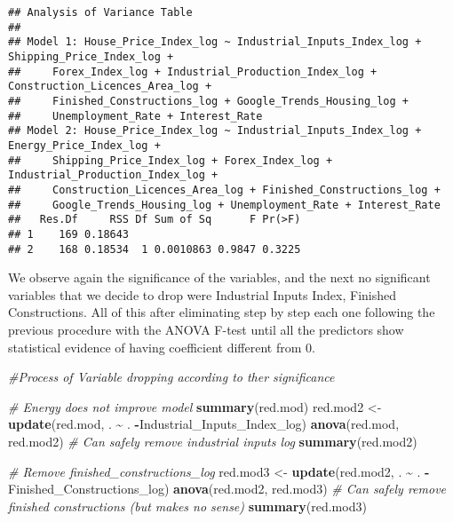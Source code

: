 \documentclass[
]{article}
\newenvironment{Shaded}{\begin{snugshade}}{\end{snugshade}}
\newcommand{\CommentTok}[1]{\textcolor[rgb]{0.56,0.35,0.01}{\textit{#1}}}
\newcommand{\FunctionTok}[1]{\textcolor[rgb]{0.13,0.29,0.53}{\textbf{#1}}}
\newcommand{\NormalTok}[1]{#1}
\newcommand{\OtherTok}[1]{\textcolor[rgb]{0.56,0.35,0.01}{#1}}
\newcommand{\SpecialCharTok}[1]{\textcolor[rgb]{0.81,0.36,0.00}{\textbf{#1}}}
\begin{document}
\begin{verbatim}
## Analysis of Variance Table
## 
## Model 1: House_Price_Index_log ~ Industrial_Inputs_Index_log + Shipping_Price_Index_log + 
##     Forex_Index_log + Industrial_Production_Index_log + Construction_Licences_Area_log + 
##     Finished_Constructions_log + Google_Trends_Housing_log + 
##     Unemployment_Rate + Interest_Rate
## Model 2: House_Price_Index_log ~ Industrial_Inputs_Index_log + Energy_Price_Index_log + 
##     Shipping_Price_Index_log + Forex_Index_log + Industrial_Production_Index_log + 
##     Construction_Licences_Area_log + Finished_Constructions_log + 
##     Google_Trends_Housing_log + Unemployment_Rate + Interest_Rate
##   Res.Df     RSS Df Sum of Sq      F Pr(>F)
## 1    169 0.18643                           
## 2    168 0.18534  1 0.0010863 0.9847 0.3225
\end{verbatim}

We observe again the significance of the variables, and the next no
significant variables that we decide to drop were Industrial Inputs
Index, Finished Constructions. All of this after eliminating step by
step each one following the previous procedure with the ANOVA F-test
until all the predictors show statistical evidence of having coefficient
different from 0.

\begin{Shaded}
\begin{Highlighting}[]
\CommentTok{\#Process of Variable dropping according to ther significance}

\CommentTok{\# Energy does not improve model}
\FunctionTok{summary}\NormalTok{(red.mod)}
\NormalTok{red.mod2 }\OtherTok{\textless{}{-}} \FunctionTok{update}\NormalTok{(red.mod, . }\SpecialCharTok{\textasciitilde{}}\NormalTok{ . }\SpecialCharTok{{-}}\NormalTok{Industrial\_Inputs\_Index\_log)}
\FunctionTok{anova}\NormalTok{(red.mod, red.mod2)}
\CommentTok{\# Can safely remove industrial inputs log}
\FunctionTok{summary}\NormalTok{(red.mod2)}

\CommentTok{\# Remove finished\_constructions\_log }
\NormalTok{red.mod3 }\OtherTok{\textless{}{-}} \FunctionTok{update}\NormalTok{(red.mod2, . }\SpecialCharTok{\textasciitilde{}}\NormalTok{ . }\SpecialCharTok{{-}}\NormalTok{Finished\_Constructions\_log)}
\FunctionTok{anova}\NormalTok{(red.mod2, red.mod3)}
\CommentTok{\# Can safely remove finished constructions (but makes no sense)}
\FunctionTok{summary}\NormalTok{(red.mod3)}
\end{Highlighting}
\end{Shaded}
\end{document}
